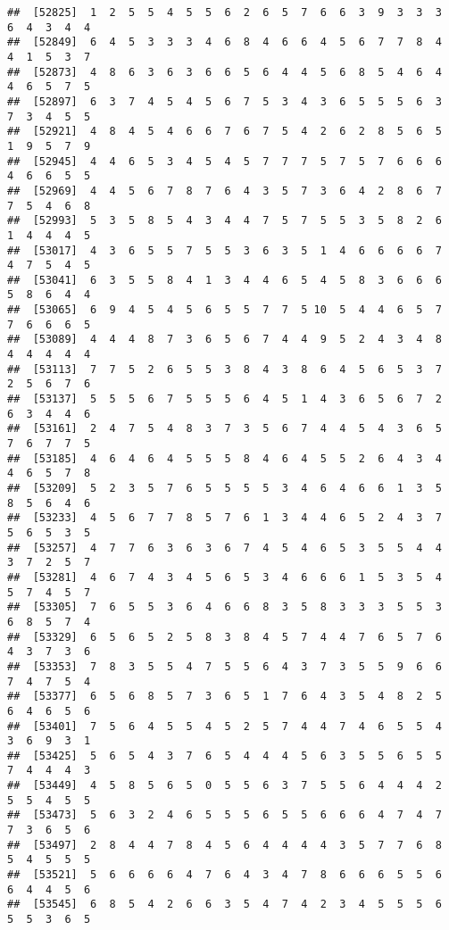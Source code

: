 \documentclass[
]{book}
\begin{document}
\begin{verbatim}
##  [52825]  1  2  5  5  4  5  5  6  2  6  5  7  6  6  3  9  3  3  3  6  4  3  4  4
##  [52849]  6  4  5  3  3  3  4  6  8  4  6  6  4  5  6  7  7  8  4  4  1  5  3  7
##  [52873]  4  8  6  3  6  3  6  6  5  6  4  4  5  6  8  5  4  6  4  4  6  5  7  5
##  [52897]  6  3  7  4  5  4  5  6  7  5  3  4  3  6  5  5  5  6  3  7  3  4  5  5
##  [52921]  4  8  4  5  4  6  6  7  6  7  5  4  2  6  2  8  5  6  5  1  9  5  7  9
##  [52945]  4  4  6  5  3  4  5  4  5  7  7  7  5  7  5  7  6  6  6  4  6  6  5  5
##  [52969]  4  4  5  6  7  8  7  6  4  3  5  7  3  6  4  2  8  6  7  7  5  4  6  8
##  [52993]  5  3  5  8  5  4  3  4  4  7  5  7  5  5  3  5  8  2  6  1  4  4  4  5
##  [53017]  4  3  6  5  5  7  5  5  3  6  3  5  1  4  6  6  6  6  7  4  7  5  4  5
##  [53041]  6  3  5  5  8  4  1  3  4  4  6  5  4  5  8  3  6  6  6  5  8  6  4  4
##  [53065]  6  9  4  5  4  5  6  5  5  7  7  5 10  5  4  4  6  5  7  7  6  6  6  5
##  [53089]  4  4  4  8  7  3  6  5  6  7  4  4  9  5  2  4  3  4  8  4  4  4  4  4
##  [53113]  7  7  5  2  6  5  5  3  8  4  3  8  6  4  5  6  5  3  7  2  5  6  7  6
##  [53137]  5  5  5  6  7  5  5  5  6  4  5  1  4  3  6  5  6  7  2  6  3  4  4  6
##  [53161]  2  4  7  5  4  8  3  7  3  5  6  7  4  4  5  4  3  6  5  7  6  7  7  5
##  [53185]  4  6  4  6  4  5  5  5  8  4  6  4  5  5  2  6  4  3  4  4  6  5  7  8
##  [53209]  5  2  3  5  7  6  5  5  5  5  3  4  6  4  6  6  1  3  5  8  5  6  4  6
##  [53233]  4  5  6  7  7  8  5  7  6  1  3  4  4  6  5  2  4  3  7  5  6  5  3  5
##  [53257]  4  7  7  6  3  6  3  6  7  4  5  4  6  5  3  5  5  4  4  3  7  2  5  7
##  [53281]  4  6  7  4  3  4  5  6  5  3  4  6  6  6  1  5  3  5  4  5  7  4  5  7
##  [53305]  7  6  5  5  3  6  4  6  6  8  3  5  8  3  3  3  5  5  3  6  8  5  7  4
##  [53329]  6  5  6  5  2  5  8  3  8  4  5  7  4  4  7  6  5  7  6  4  3  7  3  6
##  [53353]  7  8  3  5  5  4  7  5  5  6  4  3  7  3  5  5  9  6  6  7  4  7  5  4
##  [53377]  6  5  6  8  5  7  3  6  5  1  7  6  4  3  5  4  8  2  5  6  4  6  5  6
##  [53401]  7  5  6  4  5  5  4  5  2  5  7  4  4  7  4  6  5  5  4  3  6  9  3  1
##  [53425]  5  6  5  4  3  7  6  5  4  4  4  5  6  3  5  5  6  5  5  7  4  4  4  3
##  [53449]  4  5  8  5  6  5  0  5  5  6  3  7  5  5  6  4  4  4  2  5  5  4  5  5
##  [53473]  5  6  3  2  4  6  5  5  5  6  5  5  6  6  6  4  7  4  7  7  3  6  5  6
##  [53497]  2  8  4  4  7  8  4  5  6  4  4  4  4  3  5  7  7  6  8  5  4  5  5  5
##  [53521]  5  6  6  6  6  4  7  6  4  3  4  7  8  6  6  6  5  5  6  6  4  4  5  6
##  [53545]  6  8  5  4  2  6  6  3  5  4  7  4  2  3  4  5  5  5  6  5  5  3  6  5

\end{verbatim}
\end{document}
